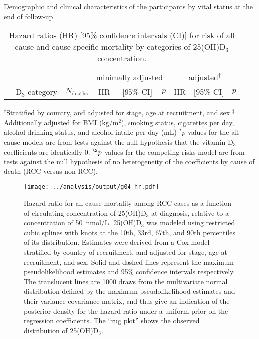 \documentclass[a4paper,10pt]{article}
\begin{document}
\begin{table}
\caption{Demographic and clinical characteristics of the participants by vital 
status at the end of follow-up.}
\centering

\end{table}

\clearpage 
\begin{table}
\caption{Hazard ratios (HR) [95\% confidence intervals (CI)] for risk of all 
cause and cause specific mortality by categories of 25(OH)D$_3$ 
concentration.}
\begin{tabular}{lrrrrrrrr}
\toprule
& & &\multicolumn{3}{c}{minimally adjusted$^\dag$} & 
\multicolumn{3}{c}{adjusted$^\ddag$} \\
 \cmidrule(r){4-6} \cmidrule(l){7-9} 
& D$_3$ category & $N_{\text{deaths}}$ & HR & [95\% CI] & $p$ & HR & [95\% CI] 
& 
$p$ \\
\midrule

\bottomrule
\end{tabular}
\newline
{\footnotesize 
$^\dag$Stratified by country, and adjusted for stage, age at recruitment, and 
sex \newline
$^\ddag$Additionally adjusted for BMI (kg/m$^2$), smoking status, cigarettes 
per day, alcohol drinking status, and alcohol intake per day (mL) \newline
$^*p$-values for the all-cause models are from tests against the null 
hypothesis that the vitamin D$_3$ coefficients are identically 0. 
\newline
$^{\S}p$-values for the competing risks model are from tests against the null 
hypothesis of no heterogeneity of the coefficients by cause of death (RCC 
versus non-RCC).
}
\end{table}
\clearpage

\begin{figure}
 \centering
\caption{Hazard ratio for all cause mortality among RCC cases as a function of 
circulating concentration of 25(OH)D$_3$ at diagnosis, relative to a 
concentration of 50~nmol/L. 25(OH)D$_3$ was modeled using restricted cubic 
splines with knots at the 10th, 33rd, 67th, and 90th percentiles of its 
distribution. Estimates were derived from a Cox model stratified by country of 
recruitment, and adjusted for stage, age at recruitment, and sex. Solid and 
dashed lines represent the maximum pseudolikelihood estimates and 95\% 
confidence intervals respectively. The translucent lines are 1000 draws from 
the multivariate normal distribution defined by the maximum pseudolikelihood 
estimates and their variance covariance matrix, and thus give an indication of 
the posterior density for the hazard ratio under a uniform prior on the 
regression coefficients. The ``rug plot'' shows the observed distribution of 
25(OH)D$_3$.}
\texttt{[image: ../analysis/output/g04\_hr.pdf]}
\end{figure}
\end{document}
